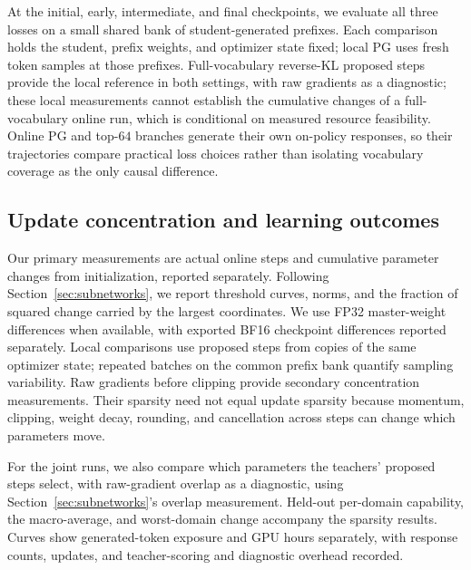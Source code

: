 At the initial, early, intermediate, and final checkpoints, we evaluate
all three losses on a small shared bank of student-generated prefixes.
Each comparison holds the student, prefix weights, and optimizer state
fixed; local PG uses fresh token samples at those prefixes.
Full-vocabulary reverse-KL proposed steps provide the local reference in
both settings, with raw gradients as a diagnostic; these local measurements
cannot establish the cumulative changes of a full-vocabulary online run,
which is conditional on measured resource feasibility. Online PG and
top-$64$ branches generate their own on-policy responses, so their
trajectories compare practical loss choices rather than isolating
vocabulary coverage as the only causal difference.

\subsection{Update concentration and learning outcomes}

Our primary measurements are actual online steps and cumulative parameter
changes from initialization, reported separately. Following
Section~\ref{sec:subnetworks}, we report threshold curves, norms, and the
fraction of squared change carried by the largest coordinates. We use FP32
master-weight differences when available, with exported BF16 checkpoint
differences reported separately. Local comparisons use proposed steps from
copies of the same optimizer state; repeated batches on the common prefix
bank quantify sampling variability. Raw gradients before clipping provide
secondary concentration measurements. Their sparsity need not equal update
sparsity because momentum, clipping, weight decay, rounding, and cancellation
across steps can change which parameters move.

For the joint runs, we also compare which parameters the teachers' proposed
steps select, with raw-gradient overlap as a diagnostic, using
Section~\ref{sec:subnetworks}'s overlap measurement. Held-out per-domain
capability, the macro-average,
and worst-domain change accompany the sparsity results. Curves show
generated-token exposure and GPU hours separately, with response counts,
updates, and teacher-scoring and diagnostic overhead recorded.

